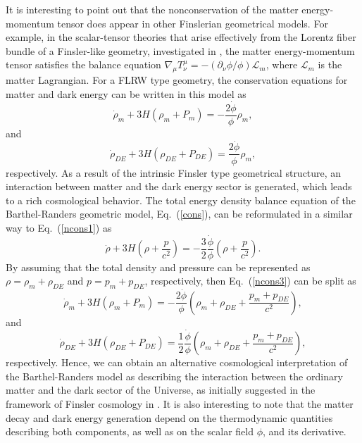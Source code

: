 \documentclass[aps,superscriptaddress, showpacs,preprintnumbers, superscriptaddress, nofootinbibt,twocolumn]{revtex4-2}
\def\be{\begin{equation}}
\def\ee{\end{equation}}
\begin{document}
It is interesting to point out that the nonconservation of the matter energy-momentum tensor does appear in other Finslerian geometrical models. For example, in the scalar-tensor theories that arise effectively from the Lorentz fiber bundle of a Finsler-like geometry, investigated in \cite{Fc19a}, the matter energy-momentum tensor satisfies the balance equation $\nabla _{\mu}T^{\mu}_{\nu}=-\left(\partial _{\nu}\phi/\phi\right)\mathcal{L}_m$, where $\mathcal{L}_m$ is the matter Lagrangian. For a FLRW type geometry, the conservation equations for matter and dark energy can be written in this model  as \cite{Fc19a}
\be\label{ncons1}
\dot{\rho}_m+3H\left(\rho _m+P_m\right)=-\frac{2\dot{\phi}}{\phi}\rho _m,
\ee
and
\be\label{ncons2}
\dot{\rho}_{DE}+3H\left(\rho _{DE}+P_{DE}\right)=\frac{2\dot{\phi}}{\phi}\rho _m,
\ee
respectively. As a result of the intrinsic Finsler type geometrical structure, an interaction between matter and the dark energy sector is generated, which leads to a rich cosmological behavior. The total energy density balance equation of the Barthel-Randers geometric model, Eq.~(\ref{cons}), can be reformulated in a similar way to Eq.~(\ref{ncons1}) as
\begin{equation}\label{ncons3}
\dot{\rho}+3H\left( \rho +\frac{p}{c^2}\right) =-\frac{3}{2}\frac{\dot\phi}{\phi}\left( \rho +\frac{p}{c^2}\right).
\end{equation}
By assuming that the total density and pressure can be represented as $\rho=\rho_m+\rho_{DE}$ and $p=p_m+p_{DE}$, respectively,  then Eq.~(\ref{ncons3}) can be split as
\be
\dot{\rho}_m+3H\left(\rho _m+P_m\right)=-\frac{2\dot{\phi}}{\phi}\left(\rho _m+\rho_{DE}+\frac{p_m+p_{DE}}{c^2}\right),
\ee
and
\be
\dot{\rho}_{DE}+3H\left(\rho _{DE}+P_{DE}\right)=\frac{1}{2}\frac{\dot{\phi}}{\phi}\left(\rho _m+\rho_{DE}+\frac{p_m+p_{DE}}{c^2}\right),
\ee
respectively. Hence, we can obtain an alternative cosmological interpretation of the Barthel-Randers model as describing the interaction between the ordinary matter and the dark sector of the Universe, as initially suggested in the framework of Finsler cosmology in \cite{Fc19a}. It is also interesting to note that the matter decay and dark energy generation depend on the thermodynamic quantities describing both components, as well as on the scalar field $\phi$, and its derivative.
\end{document}

